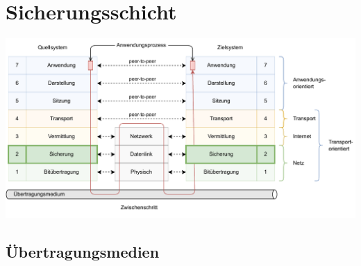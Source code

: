 \section{Sicherungsschicht}

\includegraphics[width=\textwidth]{includes/figures/defi_iso_osi_sicherung.pdf}

\subsection{Übertragungsmedien}

